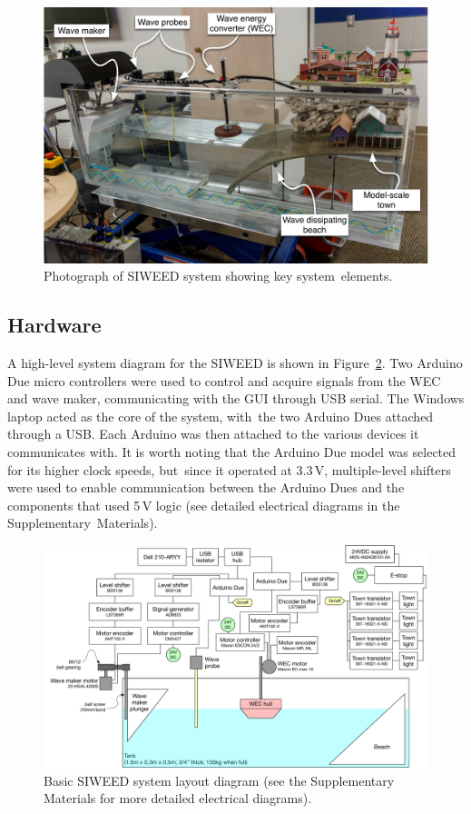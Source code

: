 \documentclass[hardware,article,submit,pdftex,moreauthors]{Definitions/mdpi}
\begin{document}
\begin{figure}[H]
  
  \includegraphics[width=1\textwidth]{diagrams/siweed_photo_with_callouts.pdf}
  \caption{Photograph of SIWEED system showing key system~elements.}
  \label{fig:siweed_photo_with_callouts}
\end{figure}
\unskip

\subsection{Hardware}
A high-level system diagram for the SIWEED is shown in Figure~\ref{fig:siweed_layout}.
Two Arduino Due micro controllers were used to control and acquire signals from the WEC and wave maker, communicating with the GUI through USB serial.
The Windows laptop acted as the core of the system, with~the two Arduino Dues attached through a USB. 
Each Arduino was then attached to the various devices it communicates with.
It is worth noting that the Arduino Due model was selected for its higher clock speeds, but~since it operated at 3.3\,V, multiple-level shifters were used to enable communication between the Arduino Dues and the components that used 5\,V logic (see detailed electrical diagrams in the Supplementary~Materials).

\begin{figure}[H]
    \includegraphics[width=1\textwidth]{diagrams/siweed_cartoon.pdf}
  \caption{Basic SIWEED system layout diagram (see the Supplementary Materials for more detailed electrical diagrams).}
  \label{fig:siweed_layout}
\end{figure}
\end{document}
